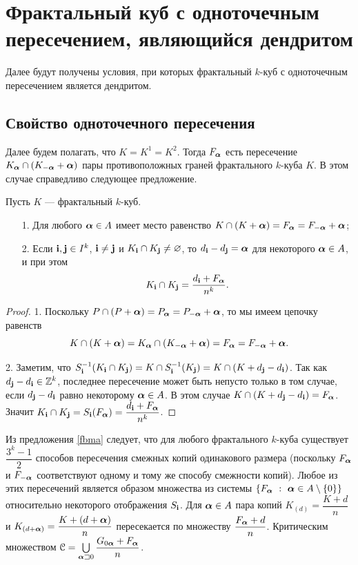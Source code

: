 \section{Фрактальный куб с одноточечным пересечением, являющийся дендритом}

Далее будут получены условия, при которых фрактальный $k$-куб с одноточечным пересечением является дендритом.

\subsection{Свойство одноточечного пересечения}

Далее будем полагать, что $K=K^1=K^2$.
Тогда $F_{\bm{\alpha}}$ есть пересечение $K_{\bm{\alpha}}\cap(K_{-{\bm{\alpha}}}+{\bm{\alpha}})$ пары противоположных граней фрактального $k$-куба $K$.
В этом случае справедливо следующее предложение.

\begin{proposition}\label{fbma}
Пусть $K$ --- фрактальный $k$-куб.
\begin{itemize}[nolistsep]
\item[1.] Для любого ${\bm{\alpha}}\in A$ имеет место равенство $K\cap(K+{\bm{\alpha}})=F_{\bm{\alpha}}=F_{-{\bm{\alpha}}}+{\bm{\alpha}} $;
\item[2.] Если ${\bf{i}},{\bf{j}} \in I^k$, ${\bf{i}}\neq {\bf{j}}$ и $K_{\bf{i}}\cap K_{\bf{j}}\neq\varnothing$, то $d_{\bf{i}}-d_{\bf{j}}={\bm{\alpha}}$ для некоторого ${\bm{\alpha}}\in A$, и при этом 
$$K_{\bf{i}}\cap K_{\bf{j}}=\dfrac{d_{\bf{i}}+F_{\bm{\alpha}}}{n^k}.$$
\end{itemize}
\end{proposition}

\begin{proof}
1. Поскольку $P\cap (P+{\bm{\alpha}})=P_{\bm{\alpha}}=P_{-{\bm{\alpha}}}+{\bm{\alpha}}$, то мы имеем цепочку равенств 
$$K\cap(K+{\bm{\alpha}})= K_{\bm{\alpha}}\cap (K_{-{\bm{\alpha}}}+{\bm{\alpha}})=F_{\bm{\alpha}}=F_{-{\bm{\alpha}}}+{\bm{\alpha}}.$$

2. Заметим, что $S_{\bf{i}}^{-1}(K_{\bf{i}}\cap K_{\bf{j}})=K\cap S_{\bf{i}}^{-1}(K_{\bf{j}})=K\cap (K+d_{\bf{j}}-d_{\bf{i}})$. 
Так как $d_{\bf{j}}-d_{\bf{i}}\in\mathbb{Z}^k$, последнее пересечение может быть непусто только в том случае, если $d_{\bf{j}}-d_{\bf{i}}$ равно некоторому ${\bm{\alpha}}\in A$. 
В этом случае $K\cap(K+d_{\bf{j}}-d_{\bf{i}})=F_{\bm{\alpha}}$.
Значит $K_{\bf{i}}\cap K_{\bf{j}}= S_{\bf{i}}(F_{\bm{\alpha}})= \dfrac{d_{\bf{i}}+F_{\bm{\alpha}}}{n^k}$. 
\end{proof}

Из предложения \ref{fbma} следует, что для любого фрактального $k$-куба существует $\dfrac{3^k-1}{2}$ способов пересечения смежных копий одинакового размера (поскольку $F_{\bm{\alpha}}$ и $F_{-{\bm{\alpha}}}$ соответствуют одному и тому же способу смежности копий). 
Любое из этих пересечений является образом множества из системы $\{F_{\bm{\alpha}}\ :\ {\bm{\alpha}}\in A\setminus\{0\}\}$ относительно некоторого отображения $S_{\bf{i}}$. 
Для ${\bm{\alpha}}\in A$ пара копий $K_{(d)}=\dfrac{K+d}{n}$ и $K_{(d+{\bm{\alpha}})}=\dfrac{K+(d+{\bm{\alpha}})}{n}$ пересекается по множеству $\dfrac{F_{\bm{\alpha}}+d}{n}$.
Критическим множеством ${\EuScript C}=\bigcup\limits_{{\bm{\alpha}}\sqsupset0}\dfrac{G_{0{\bm{\alpha}}}+F_{\bm{\alpha}}}{n}$.

